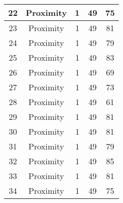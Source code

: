 \documentclass[results.tex]{subfiles}
\begin{document}
\begin{center}
\begin{tabular}{| c || c | c | c | c |}
            \hline
            22                      & Proximity                    & 1                      & 49                      & 75                   \\
            \hline
            23                      & Proximity                    & 1                      & 49                      & 81                   \\
            \hline
            24                      & Proximity                    & 1                      & 49                      & 79                   \\
            \hline
            25                      & Proximity                    & 1                      & 49                      & 83                   \\
            \hline
            26                      & Proximity                    & 1                      & 49                      & 69                   \\
            \hline
            27                      & Proximity                    & 1                      & 49                      & 73                   \\
            \hline
            28                      & Proximity                    & 1                      & 49                      & 61                   \\
            \hline
            29                      & Proximity                    & 1                      & 49                      & 81                   \\
            \hline
            30                      & Proximity                    & 1                      & 49                      & 81                   \\
            \hline
            31                      & Proximity                    & 1                      & 49                      & 79                   \\
            \hline
            32                      & Proximity                    & 1                      & 49                      & 85                   \\
            \hline
            33                      & Proximity                    & 1                      & 49                      & 81                   \\
            \hline
            34                      & Proximity                    & 1                      & 49                      & 75                   \\

\end{tabular}
\end{center}
\end{document}
